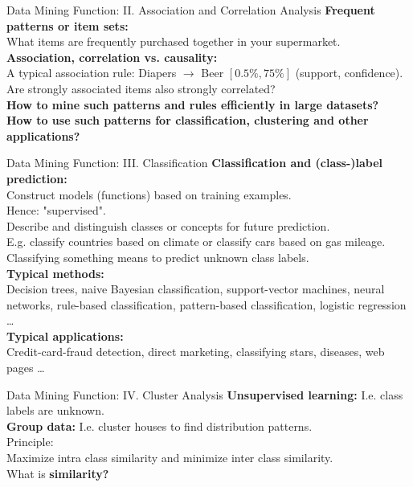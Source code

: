\begin{frame}{Data Mining Function: II. Association and Correlation Analysis}
	\textbf{Frequent patterns or item sets:}\\
	What items are frequently purchased together in your supermarket.\\[0.5cm]

	\textbf{Association, correlation vs. causality:}\\
	A typical association rule: Diapers $\rightarrow$ Beer $[0.5\%,75\%]$
	(support, confidence).\\
	Are strongly associated items also strongly correlated?\\[0.5cm]

	\textbf{How to mine such patterns and rules efficiently in large
		datasets?}\\
	\textbf{How to use such patterns for classification, clustering and other
		applications?}
\end{frame}

\begin{frame}{Data Mining Function: III. Classification}
	\textbf{Classification and (class-)label prediction:}\\
	Construct models (functions) based on training examples. \\
	Hence: "supervised".\\
	Describe and distinguish classes or concepts for future prediction.\\
	E.g. classify countries based on climate or classify cars based on gas
	mileage.\\
	Classifying something means to predict unknown class labels. \\[0.5cm]

	\textbf{Typical methods:}\\
	Decision trees, naive Bayesian classification, support-vector machines,
	neural networks, rule-based classification, pattern-based classification,
	logistic regression \ldots\\[0.5cm]

	\textbf{Typical applications:}\\
	Credit-card-fraud detection, direct marketing, classifying stars, diseases,
	web pages \ldots
\end{frame}

\begin{frame}{Data Mining Function: IV. Cluster Analysis}
	\textbf{Unsupervised learning:} I.e. class labels are unknown.\\
	\textbf{Group data:} I.e. cluster houses to find distribution
	patterns.\\[0.5cm]

	Principle:\\
	Maximize intra class similarity and minimize inter class
	similarity.\\[0.5cm]

	What is \textbf{similarity?}
\end{frame}

